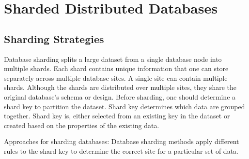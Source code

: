 
\chapter{Sharded Distributed Databases}\label{ch:ShardedDistributedDatabases}
\section{Sharding Strategies}

Database sharding splits a large dataset from a single database node into multiple shards. Each shard contains unique information that one can store separately across multiple database sites. A single site can contain multiple shards. Although the shards are distributed over multiple sites, they share the original database’s schema or design. Before sharding, one should determine a shard key to partition the dataset. Shard key determines which data are grouped together. Shard key is, either selected from an existing key in the dataset or created based on the properties of the existing data. 

Approaches for sharding databases:
Database sharding methods apply different rules to the shard key to determine the correct site for a particular set of data.

